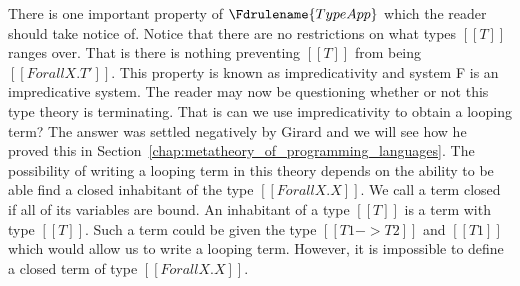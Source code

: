 There is one important property of $\Fdrulename{TypeApp}$ which the
reader should take notice of.  Notice that there are no restrictions
on what types $[[T]]$ ranges over.  That is there is nothing
preventing $[[T]]$ from being $[[Forall X.T']]$.  This property is
known as impredicativity and system F is an impredicative system.  The
reader may now be questioning whether or not this type theory is
terminating.  That is can we use impredicativity to obtain a looping
term?  The answer was settled negatively by Girard and we will see how
he proved this in Section~\ref{chap:metatheory_of_programming_languages}.
The possibility of writing a looping term in this theory depends on the
ability to be able find a closed inhabitant of the type 
$[[Forall X.X]]$.  We call a term closed if all of its variables are bound.
An inhabitant of a type $[[T]]$ is a term with type $[[T]]$.  Such a
term could be given the type $[[T1 -> T2]]$ and $[[T1]]$ which would
allow us to write a looping term.  However, it is impossible to define
a closed term of type $[[Forall X.X]]$.

